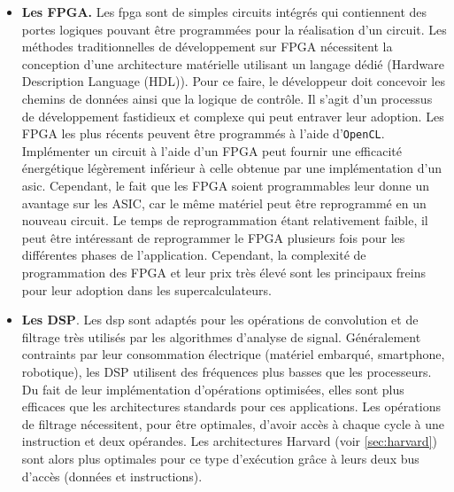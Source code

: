 \begin{enumerate}
\begin{itemize}
                            
                    \item\textbf{Les FPGA.}  Les \gls{fpga} sont de simples circuits intégrés qui contiennent des portes logiques pouvant être programmées pour la réalisation d'un circuit. 
                    Les méthodes traditionnelles de développement sur FPGA nécessitent la conception d'une architecture matérielle utilisant un langage dédié (Hardware Description Language (HDL)). Pour ce faire, le développeur doit concevoir les chemins de données ainsi que la logique de contrôle. Il s'agit d'un processus de développement fastidieux et complexe qui peut entraver leur adoption. Les FPGA les plus récents peuvent être programmés à l'aide d'\verb|OpenCL|.
                    Implémenter un circuit à l'aide d'un FPGA peut fournir une efficacité énergétique légèrement inférieur à celle obtenue par une implémentation d'un \gls{asic}. Cependant, le fait que les FPGA soient programmables leur donne un avantage sur les ASIC, car le même matériel peut être reprogrammé en un nouveau circuit. Le temps de reprogrammation étant relativement faible, il peut être intéressant de reprogrammer le FPGA plusieurs fois pour les différentes phases de l'application. Cependant, la complexité de programmation des FPGA et leur prix très élevé sont les principaux freins pour leur adoption dans les supercalculateurs.        
                    
                    \item\textbf{Les DSP}. Les \gls{dsp} sont adaptés pour les opérations de convolution et de filtrage très utilisés par les algorithmes d'analyse de signal. Généralement contraints par leur consommation électrique (matériel embarqué, smartphone, robotique), les DSP utilisent des fréquences plus basses que les processeurs. Du fait de leur implémentation d'opérations optimisées, elles sont plus efficaces que les architectures standards pour ces applications. Les opérations de filtrage nécessitent, pour être optimales, d'avoir accès à chaque cycle à une instruction et deux opérandes. Les architectures Harvard (voir \autoref{sec:harvard}) sont alors plus optimales pour ce type d'exécution grâce à leurs deux bus d'accès (données et instructions).
                     
             \end{itemize}
             

\end{enumerate}
